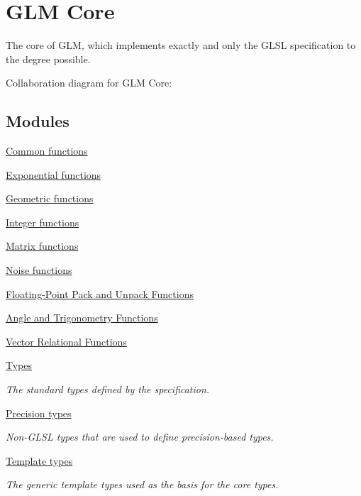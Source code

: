 \hypertarget{group__core}{}\section{G\+L\+M Core}
\label{group__core}


The core of G\+L\+M, which implements exactly and only the G\+L\+S\+L specification to the degree possible.  


Collaboration diagram for G\+L\+M Core\+:
\subsection*{Modules}
\begin{DoxyCompactItemize}
\item 
\hyperlink{group__core__func__common}{Common functions}
\item 
\hyperlink{group__core__func__exponential}{Exponential functions}
\item 
\hyperlink{group__core__func__geometric}{Geometric functions}
\item 
\hyperlink{group__core__func__integer}{Integer functions}
\item 
\hyperlink{group__core__func__matrix}{Matrix functions}
\item 
\hyperlink{group__core__func__noise}{Noise functions}
\item 
\hyperlink{group__core__func__packing}{Floating-\/\+Point Pack and Unpack Functions}
\item 
\hyperlink{group__core__func__trigonometric}{Angle and Trigonometry Functions}
\item 
\hyperlink{group__core__func__vector__relational}{Vector Relational Functions}
\item 
\hyperlink{group__core__types}{Types}
\begin{DoxyCompactList}\small\item\em The standard types defined by the specification. \end{DoxyCompactList}\item 
\hyperlink{group__core__precision}{Precision types}
\begin{DoxyCompactList}\small\item\em Non-\/\+G\+L\+S\+L types that are used to define precision-\/based types. \end{DoxyCompactList}\item 
\hyperlink{group__core__template}{Template types}
\begin{DoxyCompactList}\small\item\em The generic template types used as the basis for the core types. \end{DoxyCompactList}\end{DoxyCompactItemize}


